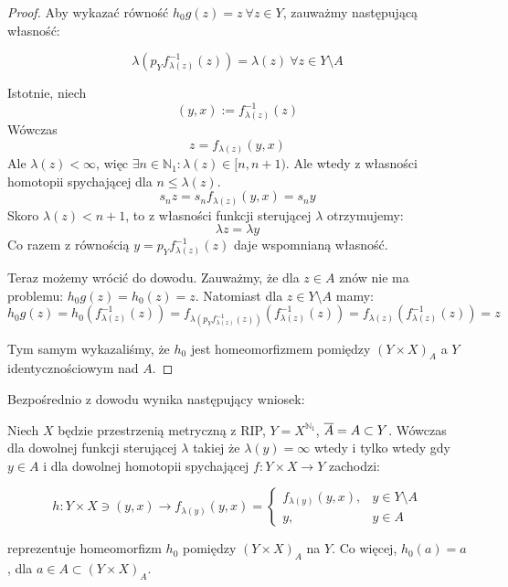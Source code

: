 \begin{thm}
\begin{proof}
    Aby wykazać równość $h_0g(z) = z\ \forall z \in Y$, zauważmy następującą własność:
    
    \[\lambda(p_Y f_{\lambda(z)}^{-1}(z)) = \lambda(z)\ \forall z \in Y \setminus A\]
    
    Istotnie, niech
    \[(y,x) := f_{\lambda(z)}^{-1}(z)\]
    Wówczas
    \[z = f_{\lambda(z)}(y,x)\]
    Ale $\lambda(z) < \infty$, więc $\exists n \in \mathbb{N}_1: \lambda(z) \in [n, n+1)$. Ale wtedy z własności homotopii spychającej dla $n \leq \lambda(z)$.
    \[s_n z = s_n f_{\lambda(z)}(y,x) = s_n y\]
    Skoro $\lambda(z) < n+1$, to z własności funkcji sterującej $\lambda$ otrzymujemy:
    \[\lambda z = \lambda y\]
    Co razem z równością $y = p_Y f_{\lambda(z)}^{-1}(z)$ daje wspomnianą własność.
    
    Teraz możemy wrócić do dowodu. Zauważmy, że dla $z \in A$ znów nie ma problemu: $h_0g(z) = h_0(z) = z$. Natomiast dla $z \in Y \setminus A$ mamy:
    \[h_0g(z) = h_0(f_{\lambda(z)}^{-1}(z)) = f_{\lambda(p_Y f_{\lambda(z)}^{-1}(z))}(f_{\lambda(z)}^{-1}(z)) = f_{\lambda(z)}(f_{\lambda(z)}^{-1}(z)) = z\]
    
    Tym samym wykazaliśmy, że $h_0$ jest homeomorfizmem pomiędzy $(Y \times X)_A$ a $Y$ identycznościowym nad $A$.
  \end{proof}
\end{thm}


Bezpośrednio z dowodu wynika następujący wniosek:
\begin{cor}
  Niech $X$ będzie przestrzenią metryczną z RIP, $Y = X^{\mathbb{N}_1}$, $\overline{A} = A \subset Y$.
  Wówczas dla dowolnej funkcji sterującej $\lambda$ takiej że $\lambda(y) = \infty$ wtedy i tylko wtedy gdy $y \in A$ i dla dowolnej homotopii spychającej $f: Y \times X \rightarrow Y$ zachodzi:
  
  \[h: Y \times X \ni (y,x) \rightarrow f_{\lambda(y)}(y,x) = 
    \begin{cases}
      f_{\lambda(y)}(y,x),&y \in Y \setminus A \\
      y,&y \in A
    \end{cases}\]
  
  reprezentuje homeomorfizm $h_0$ pomiędzy $(Y \times X)_A$ na $Y$. Co więcej, $h_0(a) = a$, dla $a \in A \subset (Y \times X)_A$.
\end{cor}


